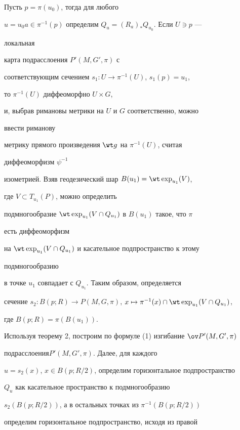 \begin{pf} 


Пусть $p=\pi(u_0)$, тогда для любого 


$u=u_0a\in\pi^{-1}(p)$ определим $Q_u=(R_a)_*Q_{u_0}$. Если $U\ni p$ --- 


локальная 


карта подрасслоения $P'(M,G',\pi)$ с 


соответствующим сечением $s_1:U\to \pi^{-1}(U)$, $s_1(p)=u_1$, 


то $\pi^{-1}(U)$ диффеоморфно $U\times G$, 


и, выбрав римановы метрики на $U$ и $G$ соответственно, можно 


ввести риманову 


метрику прямого произведения $\wt g$ на $\pi^{-1}(U)$, считая 


диффеоморфизм $\psi^{-1}$ 


изометрией. Взяв геодезический шар $B(u_1)=\wt\exp_{u_1}(V)$, 


где $V\subset T_{u_1}(P)$, можно определить 


подмногообразие $\wt\exp_{u_1}(V\cap Q_{u_1})$ в $B(u_1)$ такое, что $\pi$ 


есть диффеоморфизм 


на $\wt\exp_{u_1}(V\cap Q_{u_1})$ и касательное подпространство к этому 


подмногообразию 


в точке $u_1$ совпадает с $Q_{u_1}$. Таким образом, определяется 


сечение $s_2:B(p;R)\to P(M,G,\pi)$, $x\mapsto\pi^{-1}(x)\cap 


\wt\exp_{u_1}(V\cap Q_{u_1})$, 


где $B(p;R)=\pi(B(u_1))$. 


 


Используя теорему 2, построим по формуле (1) изгибание $\ov P{}'(M,G',\pi)$


подрасслоения\linebreak $P'(M,G',\pi)$. Далее, для каждого 


$u=s_2(x)$, $x\in B(p;R/2)$, определим горизонтальное подпространство 


$Q_u$ как касательное пространство к подмногообразию 


$s_2(B(p;R/2))$, а в остальных точках из $\pi^{-1}(B(p;R/2))$


определим горизонтальное подпространство, исходя из правой 



\end{pf}
